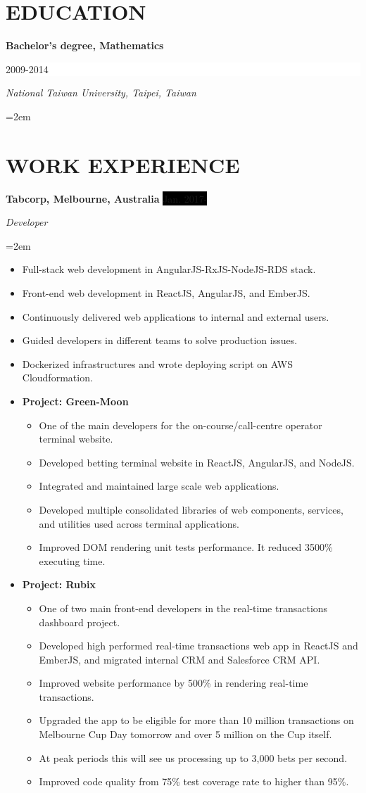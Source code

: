 \documentclass[a4paper, 11pt]{article}
\newcommand{\NewPart}[1]{\section*{\uppercase{#1}}}
\newcommand{\EducationEntry}[4]{
		\noindent \textbf{#1} \hfill      %
		\colorbox{White}{%
			\parbox{5cm}{%
			\hfill\color{Black}#2}} \par  %
		\noindent \textit{#3} \par        %
		\noindent\hangindent=2em\hangafter=0 \small #4 %
		\normalsize \par}
\newcommand{\WorkEntry}[4]{				  %
		\noindent \textbf{#1} \hfill      %
		\noindent\colorbox{Black}{\color{White}#2} \par  %
		\noindent \textit{#3} \par              %
		\noindent\hangindent=2em\hangafter=0 \small #4 %
		\normalsize \par}
\begin{document}
\NewPart{Education}{}

\EducationEntry{Bachelor's degree, Mathematics}{2009-2014}
{National Taiwan University, Taipei, Taiwan}{}

\NewPart{Work Experience}{}

\WorkEntry{Tabcorp, Melbourne, Australia}{Jan. 2017-}{Developer}{
\begin{itemize}
	\item {Full-stack web development in AngularJS-RxJS-NodeJS-RDS stack.}
	\item {Front-end web development in ReactJS, AngularJS, and EmberJS.}
	\item {Continuously delivered web applications to internal and external users.}
	\item {Guided developers in different teams to solve production issues.}
	\item {Dockerized infrastructures and wrote deploying script on AWS Cloudformation.}
	\item []{
		\textbf{Project: Green-Moon}
		\begin{itemize}
			\item {One of the main developers for the on-course/call-centre operator terminal website.}
			\item {Developed betting terminal website in ReactJS, AngularJS, and NodeJS.}
			\item {Integrated and maintained large scale web applications.}
			\item {Developed multiple consolidated libraries of web components, services, and utilities used across terminal applications.}
			\item {Improved DOM rendering unit tests performance. It reduced 3500\% executing time.}
		\end{itemize}
	}
	\item []{
		\textbf{Project: Rubix}
		\begin{itemize}
			\item {One of two main front-end developers in the real-time transactions dashboard project.}
			\item {Developed high performed real-time transactions web app in ReactJS and EmberJS, and migrated internal CRM and Salesforce CRM API.}
			\item {Improved website performance by 500\% in rendering real-time transactions.}
			\item {Upgraded the app to be eligible for more than 10 million transactions on Melbourne Cup Day tomorrow and over 5 million on the Cup itself.}
			\item {At peak periods this will see us processing up to 3,000 bets per second.}
			\item {Improved code quality from 75\% test coverage rate to higher than 95\%.}
		\end{itemize}
	}
\end{itemize}
}
\end{document}

